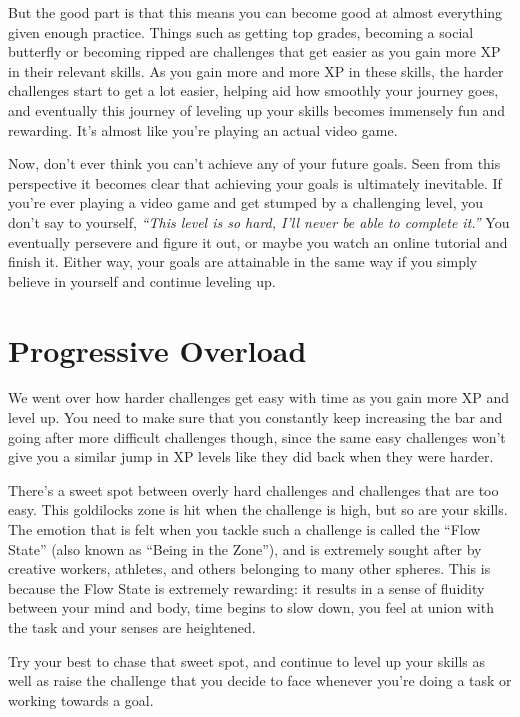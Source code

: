 \documentclass[
]{book}
\begin{document}
But the good part is that this means you can become good at almost everything given enough practice. Things such as getting top grades, becoming a social butterfly or becoming ripped are challenges that get easier as you gain more XP in their relevant skills. As you gain more and more XP in these skills, the harder challenges start to get a lot easier, helping aid how smoothly your journey goes, and eventually this journey of leveling up your skills becomes immensely fun and rewarding. It's almost like you're playing an actual video game.

Now, don't ever think you can't achieve any of your future goals. Seen from this perspective it becomes clear that achieving your goals is ultimately inevitable. If you're ever playing a video game and get stumped by a challenging level, you don't say to yourself, \emph{``This level is so hard, I'll never be able to complete it.''} You eventually persevere and figure it out, or maybe you watch an online tutorial and finish it. Either way, your goals are attainable in the same way if you simply believe in yourself and continue leveling up.

\hypertarget{progressive-overload}{%
\section{Progressive Overload}\label{progressive-overload}}

We went over how harder challenges get easy with time as you gain more XP and level up. You need to make sure that you constantly keep increasing the bar and going after more difficult challenges though, since the same easy challenges won't give you a similar jump in XP levels like they did back when they were harder.

There's a sweet spot between overly hard challenges and challenges that are too easy. This goldilocks zone is hit when the challenge is high, but so are your skills. The emotion that is felt when you tackle such a challenge is called the ``Flow State'' (also known as ``Being in the Zone''), and is extremely sought after by creative workers, athletes, and others belonging to many other spheres. This is because the Flow State is extremely rewarding: it results in a sense of fluidity between your mind and body, time begins to slow down, you feel at union with the task and your senses are heightened.

Try your best to chase that sweet spot, and continue to level up your skills as well as raise the challenge that you decide to face whenever you're doing a task or working towards a goal.
\end{document}
